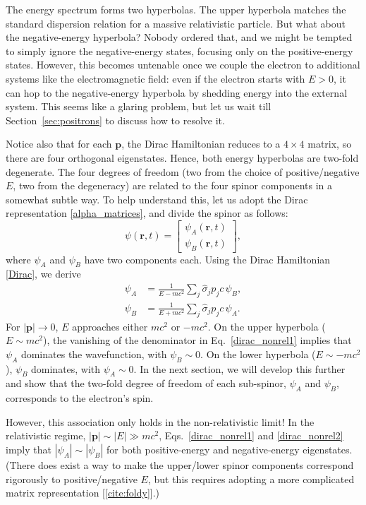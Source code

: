 \documentclass[prx,12pt]{revtex4-2}
\begin{document}
The energy spectrum forms two hyperbolas.  The upper hyperbola matches
the standard dispersion relation for a massive relativistic particle.
But what about the negative-energy hyperbola?  Nobody ordered that,
and we might be tempted to simply ignore the negative-energy states,
focusing only on the positive-energy states.  However, this becomes
untenable once we couple the electron to additional systems like the
electromagnetic field: even if the electron starts with $E > 0$, it
can hop to the negative-energy hyperbola by shedding energy into the
external system.  This seems like a glaring problem, but let us wait
till Section~\ref{sec:positrons} to discuss how to resolve it.

Notice also that for each $\mathbf{p}$, the Dirac Hamiltonian reduces
to a $4\times4$ matrix, so there are four orthogonal eigenstates.
Hence, both energy hyperbolas are two-fold degenerate.  The four
degrees of freedom (two from the choice of positive/negative $E$, two
from the degeneracy) are related to the four spinor components in a
somewhat subtle way.  To help understand this, let us adopt the Dirac
representation \eqref{alpha_matrices}, and divide the spinor as
follows:
\begin{equation}
  \psi(\mathbf{r},t) = \begin{bmatrix}\psi_A(\mathbf{r},t)
    \\ \psi_B(\mathbf{r},t)
  \end{bmatrix},
  \label{diracdivision}
\end{equation}
where $\psi_A$ and $\psi_B$ have two components each.  Using the Dirac
Hamiltonian \eqref{Dirac}, we derive
\begin{align}
  \psi_A &= \frac{1}{E - mc^2} \sum_j \hat{\sigma}_j p_jc\, \psi_B,
  \label{dirac_nonrel1} \\
  \psi_B &= \frac{1}{E + mc^2} \sum_j \hat{\sigma}_j p_jc\, \psi_A.
  \label{dirac_nonrel2}
\end{align}
For $|\mathbf{p}| \rightarrow 0$, $E$ approaches either $mc^2$ or
$-mc^2$.  On the upper hyperbola ($E \sim mc^2$), the vanishing of the
denominator in Eq.~\eqref{dirac_nonrel1} implies that $\psi_A$
dominates the wavefunction, with $\psi_B \sim 0$.  On the lower
hyperbola ($E \sim -mc^2$), $\psi_B$ dominates, with $\psi_A \sim 0$.
In the next section, we will develop this further and show that the
two-fold degree of freedom of each sub-spinor, $\psi_A$ and $\psi_B$,
corresponds to the electron's spin.

However, this association only holds in the non-relativistic limit!
In the relativistic regime, $|\mathbf{p}| \sim |E| \gg mc^2$,
Eqs.~\eqref{dirac_nonrel1} and \eqref{dirac_nonrel2} imply that
$|\psi_A| \sim |\psi_B|$ for both positive-energy and negative-energy
eigenstates.  (There does exist a way to make the upper/lower spinor
components correspond rigorously to positive/negative $E$, but this
requires adopting a more complicated matrix representation
[\ref{cite:foldy}].)
\end{document}

